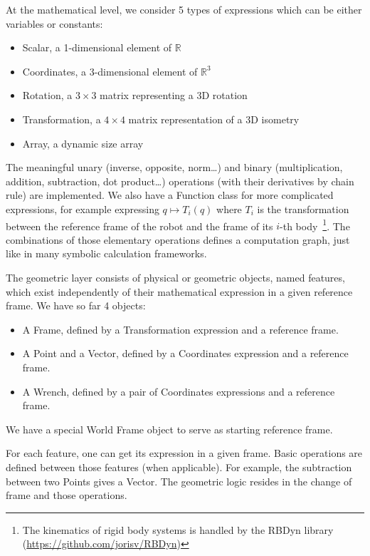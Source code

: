At the mathematical level, we consider 5 types of expressions which can be either variables or constants:
\begin{itemize}
  \item Scalar, a 1-dimensional element of $\mathbb{R}$
  \item Coordinates, a 3-dimensional element of $\mathbb{R}^3$
  \item Rotation, a $3\times3$ matrix representing a 3D rotation
  \item Transformation, a $4\times4$ matrix representation of a 3D isometry
  \item Array, a dynamic size array
\end{itemize}
The meaningful unary (inverse, opposite, norm\ldots) and binary (multiplication, addition, subtraction, dot product\ldots) operations (with their derivatives by chain rule) are implemented.
We also have a Function class for more complicated expressions, for example expressing $q \mapsto T_i(q)$ where $T_i$ is the transformation between the reference frame of the robot and the frame of its $i$-th body~\footnote{The kinematics of rigid body systems is handled by the RBDyn library (\url{https://github.com/jorisv/RBDyn})}.
The combinations of those elementary operations defines a computation graph, just like in many symbolic calculation frameworks.

The geometric layer consists of physical or geometric objects, named features, which exist independently of their mathematical expression in a given reference frame.
We have so far 4 objects:
\begin{itemize}
  \item A Frame, defined by a Transformation expression and a reference frame.
  \item A Point and a Vector, defined by a Coordinates expression and a reference frame.
  \item A Wrench, defined by a pair of Coordinates expressions and a reference frame.
\end{itemize}
We have a special World Frame object to serve as starting reference frame.

For each feature, one can get its expression in a given frame.
Basic operations are defined between those features (when applicable).
For example, the subtraction between two Points gives a Vector.
The geometric logic resides in the change of frame and those operations.


